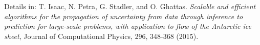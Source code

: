 \documentclass[10pt,final,xcolor=dvipsnames]{beamer}
\begin{document}
\begin{frame}
	\vspace{0.3in}
	\scriptsize{Details in: T. Isaac, N. Petra, G. Stadler, and
		O. Ghattas. {\em Scalable and efficient algorithms for the
			propagation of uncertainty from data through inference to
			prediction for large-scale problems, with application to flow of
			the Antarctic ice sheet}, Journal of Computational Physics, 296,
		348-368 (2015).}
\end{frame}

\end{document}
